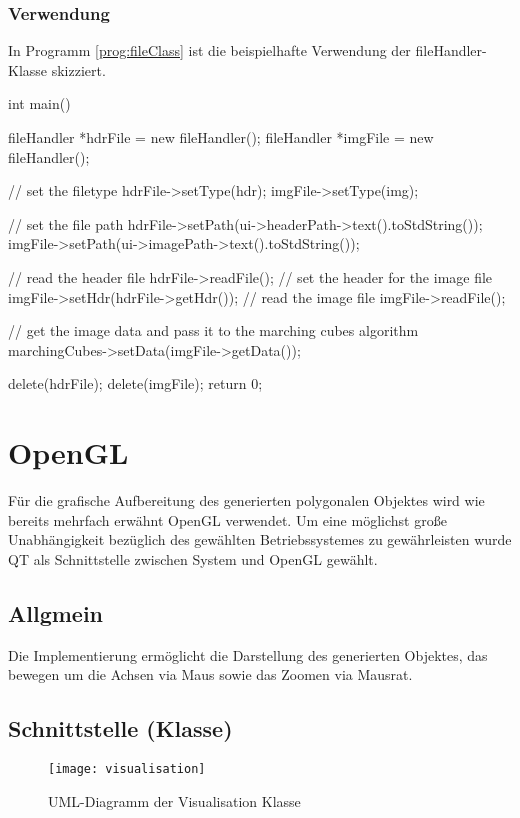 \subsubsection{Verwendung}
In Programm \ref{prog:fileClass} ist die beispielhafte Verwendung der fileHandler-Klasse skizziert.
\begin{program}[H]
	\caption{Verwendung der fileHandler-Klasse}
	\label{prog:fileClass}
	\begin{CCode}
		int main(){
			fileHandler *hdrFile = new fileHandler();
			fileHandler *imgFile = new fileHandler();
			
			// set the filetype
			hdrFile->setType(hdr);
			imgFile->setType(img);
			
			// set the file path
			hdrFile->setPath(ui->headerPath->text().toStdString());
			imgFile->setPath(ui->imagePath->text().toStdString());
			
			// read the header file
			hdrFile->readFile();
			// set the header for the image file
			imgFile->setHdr(hdrFile->getHdr());
			// read the image file
			imgFile->readFile();
			
			// get the image data and pass it to the marching cubes algorithm
			marchingCubes->setData(imgFile->getData());
			
			delete(hdrFile);
			delete(imgFile);
			return 0;	
		}
	\end{CCode}
\end{program}
\section{OpenGL}
Für die grafische Aufbereitung des generierten polygonalen Objektes wird wie bereits mehrfach erwähnt OpenGL verwendet. Um eine möglichst große Unabhängigkeit bezüglich des gewählten Betriebssystemes zu gewährleisten wurde QT als Schnittstelle zwischen System und OpenGL gewählt.
\subsection{Allgmein}
Die Implementierung ermöglicht die Darstellung des generierten Objektes, das bewegen um die Achsen via Maus sowie das Zoomen via Mausrat.
\subsection{Schnittstelle (Klasse)}
\begin{figure}[H]
	\centering
	\texttt{[image: visualisation]}
	\caption{UML-Diagramm der Visualisation Klasse}
	\label{fig:visualisation}
\end{figure}
